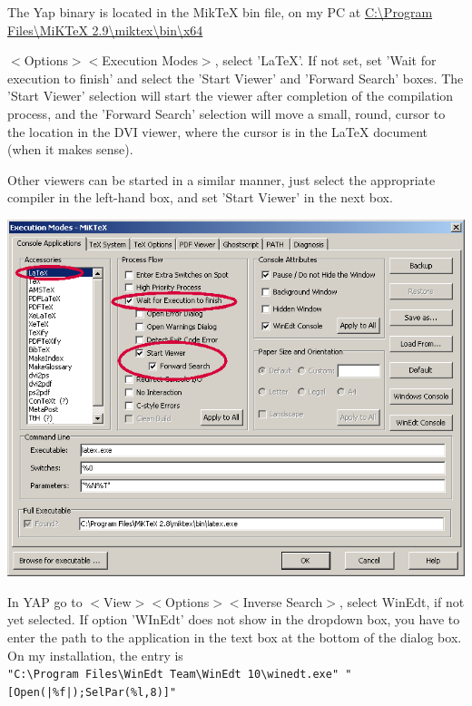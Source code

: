 The Yap binary is located in the MikTeX bin file, on my PC at
\url{C:\Program Files\MiKTeX 2.9\miktex\bin\x64}

$<$Options$>$$<$Execution Modes$>$, select 'LaTeX'. If not set, set 'Wait for execution to finish' and select the 'Start Viewer' and 'Forward Search' boxes. The 'Start Viewer' selection will start the viewer after completion of the compilation process, and the 'Forward Search' selection will move a small, round, cursor to the location in the DVI viewer, where the cursor is in the LaTeX document (when it makes sense).

Other viewers can be started in a similar manner, just select the appropriate compiler in the left-hand box, and set 'Start Viewer' in the next box.


\centerline{\includegraphics[bb= 0 0 696 543, width=\textwidth]{eps/StartViewer.png}}



In YAP go to  $<$View$>$$<$Options$>$$<$Inverse Search$>$, select WinEdt, if not yet selected. If option 'WInEdt' does not show in the dropdown box,  you have to enter the path to the application in the text box at the bottom of the dialog box.  On my installation, the entry is	\\
{\small \verb+"C:\Program Files\WinEdt Team\WinEdt 10\winedt.exe" "[Open(|%f|);SelPar(%l,8)]"+}

